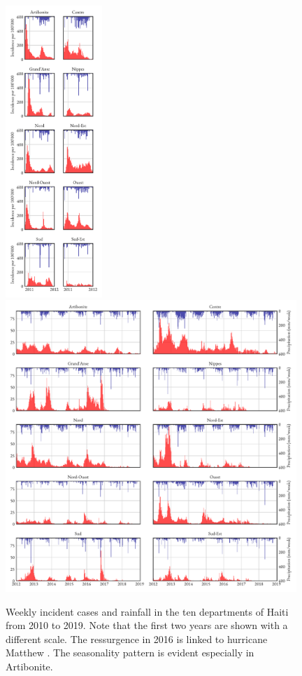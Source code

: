 \begin{figure}
	\centering
	\includegraphics[height=11cm,keepaspectratio]{fig_cholera-haiti-ocv/haiti-2010.pdf}
		\includegraphics[height=11cm,keepaspectratio]{fig_cholera-haiti-ocv/haiti-2012.pdf}
	\caption[Incident cholera cases and rainfall in Haiti from 2010 to 2019]{Weekly incident cases and rainfall in the ten departments of Haiti from 2010 to 2019. Note that the first two years are shown with a different scale. The ressurgence in 2016 is linked to hurricane Matthew \parencites{Pasetto:RealtimeForecastingCholera:2018,Khan:AssessmentRiskCholera:2017}. The seasonality pattern is evident especially in Artibonite.}
	\label{fig:data2}
\end{figure}


